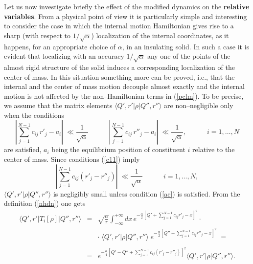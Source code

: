 \documentclass[10pt,a4paper]{article}
\begin{document}
Let us now investigate briefly the effect of the modified dynamics
on the {\bf relative variables}. From a physical point of view it
is particularly simple and interesting to consider the case in
which the internal motion Hamiltonian gives rise to a sharp (with
respect to $1/\sqrt{\alpha}$) localization of the internal
coordinates, as it happens, for an appropriate choice of $\alpha$, in
an insulating solid. In such a case it is evident that localizing
with an accuracy $1/\sqrt{\alpha}$ any one of the points of the
almost rigid structure of the solid induces a corresponding
localization of the center  of mass. In this situation something
more can be proved, i.e., that the internal and the center  of
mass motion decouple almost exactly and the internal motion is not
affected by the non--Hamiltonian terms in (\ref{pclm}). To be
precise, we assume that the matrix elements $\langle
Q',r'|\rho|Q'',r''\rangle$ are non--negligible only when the
conditions
\begin{equation} \label{c11}
| \sum_{j=1}^{N-1} c_{ij}\, {r'}_{j} - a_{i} | \; \ll
\frac{1}{\sqrt{\alpha}} \qquad\quad | \sum_{j=1}^{N-1} c_{ij}\,
{r''}_{j} - a_{i} | \; \ll \frac{1}{\sqrt{\alpha}}, \qquad\quad i
= 1, \ldots, N
\end{equation}
are satisfied, $a_{i}$ being the equilibrium position of
constituent $i$ relative to the center  of mass. Since conditions
(\ref{c11}) imply
\begin{equation} \label{ac}
| \sum_{j=1}^{N-1} c_{ij} ({r'}_{j} - {r''}_{j}) | \; \ll
\frac{1}{\sqrt{\alpha}} \qquad \quad i = 1, \ldots, N,
\end{equation}
$\langle Q',r'|\rho|Q'',r''\rangle$ is negligibly small unless
condition (\ref{ac}) is satisfied. From the definition
(\ref{nhdn}) one gets
\begin{eqnarray} \label{vslp}
\langle Q',r'|T_{i}[\rho]|Q'',r''\rangle & = &
\sqrt{\frac{\alpha}{\pi}} \int_{-\infty}^{+\infty} dx\,
e^{\displaystyle -\frac{\alpha}{2} \left[Q' + \sum_{j=1}^{N-1}
c_{ij} {r'}_{j} - x \right]^{2}}\cdot \nonumber \\
& & \cdot\; \langle Q',r'|\rho|Q'',r''\rangle\; e^{\displaystyle
-\frac{\alpha}{2} \left[Q'' + \sum_{j=1}^{N-1}
c_{ij} {r''}_{j} - x \right]^{2}}\; = \nonumber \\
& & \nonumber \\ & = & e^{\displaystyle -\frac{\alpha}{4} \left[Q'
- Q'' + \sum_{j=1}^{N-1} c_{ij} ({r'}_{j} - {r''}_{j})
\right]^{2}}
\langle Q',r'|\rho|Q'',r''\rangle. \nonumber \\
& &
\end{eqnarray}
\end{document}

